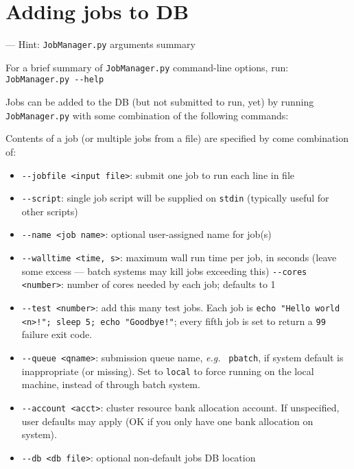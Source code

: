 \documentclass[12pt,english]{article}
\newenvironment{hint}[1][{}]{
\definecolor{shadecolor}{rgb}{.9,.9,.9}
\begin{shaded}
{\color{purple}--- Hint: #1}

}{\end{shaded}}
\newcommand{\cd}[1]{\texorpdfstring{{\color{blue} \texttt{#1}}}{#1}}
\newcommand{\eg}{{\em e.g.}}
\begin{document}
\section{Adding jobs to DB}

\begin{hint}[\cd{JobManager.py} arguments summary]
For a brief summary of \cd{JobManager.py} command-line options, run: \newline
\cd{JobManager.py {-}{-}help}
\end{hint}

Jobs can be added to the DB (but not submitted to run, yet) by running
    \cd{JobManager.py} with some combination of the following commands:

Contents of a job (or multiple jobs from a file) are specified by come combination of:
\begin{itemize}
    \item \cd{{-}{-}jobfile <input file>}: submit one job to run each line in file
    \item \cd{{-}{-}script}: single job script will be supplied on \cd{stdin} (typically useful for other scripts)
    \item \cd{{-}{-}name <job name>}: optional user-assigned name for job(s)
    \item \cd{{-}{-}walltime <time, s>}: maximum wall run time per job, in seconds (leave some excess --- batch systems may kill jobs exceeding this) \cd{{-}{-}cores <number>}: number of cores needed by each job; defaults to 1
    \item \cd{{-}{-}test <number>}: add this many test jobs.
        Each job is \cd{echo "Hello world <n>!"; sleep 5; echo "Goodbye!"};
        every fifth job is set to return a \cd{99} failure exit code.
    \item \cd{{-}{-}queue <qname>}: submission queue name, \eg\ \cd{pbatch},
        if system default is inappropriate (or missing).
        Set to \cd{local} to force running on the local machine, instead of through batch system.
    \item \cd{{-}{-}account <acct>}: cluster resource bank allocation account.
        If unspecified, user defaults may apply (OK if you only have one bank allocation on system).
    \item \cd{{-}{-}db <db file>}: optional non-default jobs DB location
\end{itemize}

\end{document}
